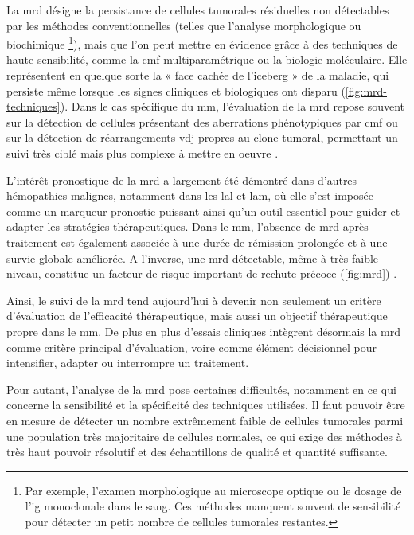 La \gls{mrd} désigne la persistance de cellules tumorales résiduelles non
détectables par les méthodes conventionnelles (telles que l'analyse
morphologique ou biochimique \footnote{Par exemple, l'examen morphologique au microscope 
optique ou le dosage de l'\gls{ig} monoclonale dans le sang. 
Ces méthodes manquent souvent de sensibilité pour détecter un petit nombre de cellules 
tumorales restantes.}), mais que l'on peut mettre en évidence grâce à
des techniques de haute sensibilité, comme la \gls{cmf} multiparamétrique ou la
biologie moléculaire. Elle représentent en quelque sorte la « face cachée de
l'iceberg » de la maladie, qui persiste même lorsque les signes cliniques et
biologiques ont disparu (\autoref{fig:mrd-techniques}). Dans le cas spécifique
du \gls{mm}, l'évaluation de la \gls{mrd} repose souvent sur la détection de
cellules présentant des aberrations phénotypiques par \gls{cmf} ou sur la
détection de réarrangements \gls{vdj} propres au clone tumoral, permettant un
suivi très ciblé mais plus complexe à mettre en oeuvre
\cite{bertaminiMRDAssessmentMultiple2021}.



L'intérêt pronostique de la \gls{mrd} a largement été démontré dans d'autres
hémopathies malignes, notamment dans les \gls{lal} et \gls{lam}, où elle s'est
imposée comme un marqueur pronostic puissant ainsi qu'un outil essentiel pour
guider et adapter les stratégies thérapeutiques. Dans le \gls{mm}, l'absence de
\gls{mrd} après traitement est également associée à une durée de rémission
prolongée et à une survie globale améliorée. A l'inverse, une \gls{mrd}
détectable, même à très faible niveau, constitue un facteur de risque important
de rechute précoce (\autoref{fig:mrd})
\cite{munshiLargeMetaanalysisEstablishes2020}.

Ainsi, le suivi de la \gls{mrd} tend aujourd'hui à devenir non seulement un
critère d'évaluation de l'efficacité thérapeutique, mais aussi un objectif
thérapeutique propre dans le \gls{mm}. De plus en plus d'essais cliniques
intègrent désormais la \gls{mrd} comme critère principal d'évaluation, voire
comme élément décisionnel pour intensifier, adapter ou interrompre un
traitement.



Pour autant, l'analyse de la \gls{mrd} pose certaines difficultés, notamment en
ce qui concerne la sensibilité et la spécificité des techniques utilisées. Il
faut pouvoir être en mesure de détecter un nombre extrêmement faible de
cellules tumorales parmi une population très majoritaire de cellules normales,
ce qui exige des méthodes à très haut pouvoir résolutif et des échantillons de
qualité et quantité suffisante.

